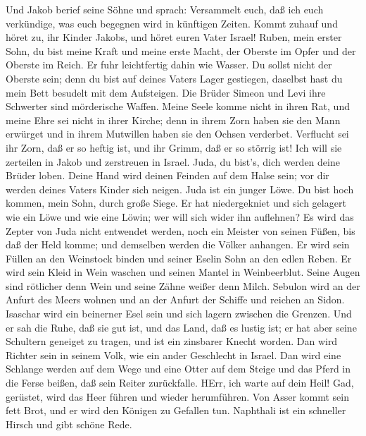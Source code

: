  Und Jakob berief seine Söhne und sprach: Versammelt euch,
daß ich euch verkündige, was euch begegnen wird in künftigen Zeiten.
 Kommt zuhauf und höret zu, ihr Kinder Jakobs, und höret
euren Vater Israel!  Ruben, mein erster Sohn, du bist meine
Kraft und meine erste Macht, der Oberste im Opfer und der Oberste im
Reich.  Er fuhr leichtfertig dahin wie Wasser. Du sollst
nicht der Oberste sein; denn du bist auf deines Vaters Lager gestiegen,
daselbst hast du mein Bett besudelt mit dem Aufsteigen.  Die
Brüder Simeon und Levi ihre Schwerter sind mörderische Waffen.
 Meine Seele komme nicht in ihren Rat, und meine Ehre sei
nicht in ihrer Kirche; denn in ihrem Zorn haben sie den Mann erwürget
und in ihrem Mutwillen haben sie den Ochsen verderbet. 
Verflucht sei ihr Zorn, daß er so heftig ist, und ihr Grimm, daß er so
störrig ist! Ich will sie zerteilen in Jakob und zerstreuen in Israel.
 Juda, du bist's, dich werden deine Brüder loben. Deine Hand
wird deinen Feinden auf dem Halse sein; vor dir werden deines Vaters
Kinder sich neigen.  Juda ist ein junger Löwe. Du bist hoch
kommen, mein Sohn, durch große Siege. Er hat niedergekniet und sich
gelagert wie ein Löwe und wie eine Löwin; wer will sich wider ihn
auflehnen?  Es wird das Zepter von Juda nicht entwendet
werden, noch ein Meister von seinen Füßen, bis daß der Held komme; und
demselben werden die Völker anhangen.  Er wird sein Füllen
an den Weinstock binden und seiner Eselin Sohn an den edlen Reben. Er
wird sein Kleid in Wein waschen und seinen Mantel in Weinbeerblut.
 Seine Augen sind rötlicher denn Wein und seine Zähne
weißer denn Milch.  Sebulon wird an der Anfurt des Meers
wohnen und an der Anfurt der Schiffe und reichen an Sidon. 
Isaschar wird ein beinerner Esel sein und sich lagern zwischen die
Grenzen.  Und er sah die Ruhe, daß sie gut ist, und das
Land, daß es lustig ist; er hat aber seine Schultern geneiget zu tragen,
und ist ein zinsbarer Knecht worden.  Dan wird Richter sein
in seinem Volk, wie ein ander Geschlecht in Israel.  Dan
wird eine Schlange werden auf dem Wege und eine Otter auf dem Steige und
das Pferd in die Ferse beißen, daß sein Reiter zurückfalle.
 HErr, ich warte auf dein Heil!  Gad,
gerüstet, wird das Heer führen und wieder herumführen.  Von
Asser kommt sein fett Brot, und er wird den Königen zu Gefallen tun.
 Naphthali ist ein schneller Hirsch und gibt schöne Rede.
